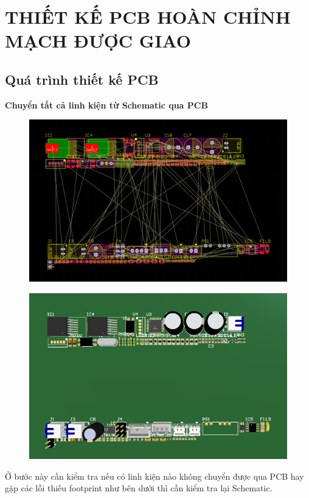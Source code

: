 \chapter{THIẾT KẾ PCB HOÀN CHỈNH MẠCH ĐƯỢC GIAO} 
\section{Quá trình thiết kế PCB}
\textbf{Chuyển tất cả linh kiện từ Schematic qua PCB}
\begin{figure}[H]
    \centering
    \includegraphics[width=1\textwidth]{pictures/7a.png}
\end{figure}
\begin{figure}[H]
    \centering
    \includegraphics[width=1\textwidth]{pictures/7b.png}
\end{figure}
Ở bước này cần kiểm tra nếu có linh kiện nào không chuyển được qua PCB hay gặp các lỗi thiếu footprint như bên dưới thì cần kiểm tra lại Schematic.

